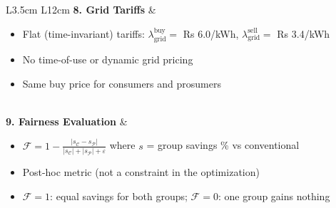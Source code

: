 \documentclass[11pt]{article}
\begin{document}
\begin{table}[h!]
\begin{tabular}{L{3.5cm} L{12cm}}
\textbf{8. Grid Tariffs} &
\begin{itemize} \setlength\itemsep{0pt}
  \item Flat (time-invariant) tariffs: $\lambda^{\text{buy}}_{\text{grid}} = $ Rs 6.0/kWh, $\lambda^{\text{sell}}_{\text{grid}} = $ Rs 3.4/kWh
  \item No time-of-use or dynamic grid pricing
  \item Same buy price for consumers and prosumers
\end{itemize} \\

\textbf{9. Fairness Evaluation} &
\begin{itemize} \setlength\itemsep{0pt}
  \item $\mathcal{F} = 1 - \frac{|s_{\mathcal{C}} - s_{\mathcal{P}}|}{|s_{\mathcal{C}}| + |s_{\mathcal{P}}| + \varepsilon}$ where $s$ = group savings \% vs conventional
  \item Post-hoc metric (not a constraint in the optimization)
  \item $\mathcal{F} = 1$: equal savings for both groups; $\mathcal{F} = 0$: one group gains nothing
\end{itemize} \\

\bottomrule
\end{tabular}
\end{table}
\end{document}

